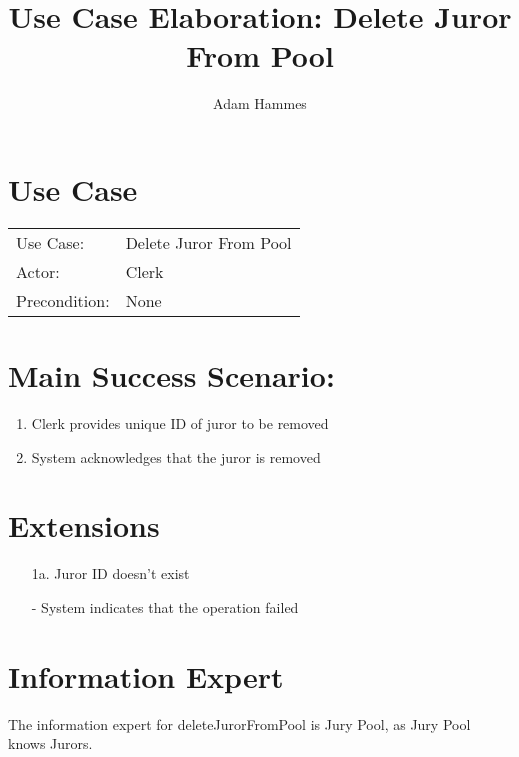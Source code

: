 \documentclass{article}
\title{Use Case Elaboration: Delete Juror From Pool}
\author{Adam Hammes}
\begin{document}
\maketitle


\section*{Use Case}
\begin{tabular}{l l}
  Use Case:     & Delete Juror From Pool\\
  Actor:        & Clerk\\
  Precondition: & None\\
\end{tabular}

\section*{Main Success Scenario:}
\begin{enumerate}
  \item Clerk provides unique ID of juror to be removed
  \item System acknowledges that the juror is removed
\end{enumerate}


\section*{Extensions}
\begin{itemize}
  \item [1a.] Juror ID doesn't exist
  
  - System indicates that the operation failed
\end{itemize}


\section*{Information Expert}

The information expert for deleteJurorFromPool is Jury Pool, as Jury Pool knows Jurors.
\end{document}
